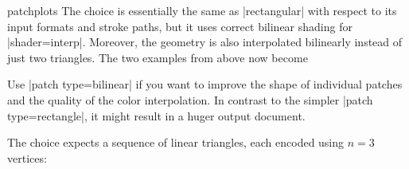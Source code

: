 {\begin{pgfplotslibrary}{patchplots}
	The choice  is essentially the same as |rectangular| with respect to its input formats and stroke paths, but it uses correct bilinear shading for |shader=interp|. Moreover, the geometry is also interpolated bilinearly instead of just two triangles. The two examples from above now become
\begin{codeexample}[]
\end{codeexample}
\begin{codeexample}[]
\end{codeexample}
	\noindent Use |patch type=bilinear| if you want to improve the shape of individual patches and the quality of the color interpolation. In contrast to the simpler |patch type=rectangle|, it might result in a huger output document.

	The choice  expects a sequence of linear triangles, each encoded using $n=3$ vertices:
\begin{codeexample}[]
\end{codeexample}


\end{pgfplotslibrary}}
